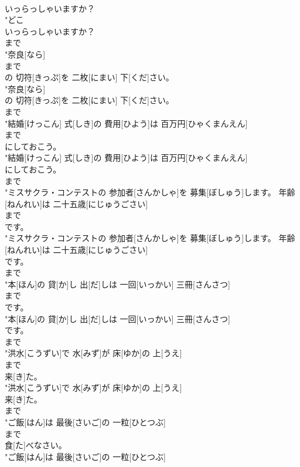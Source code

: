 \documentclass[8pt]{extreport}
\begin{document}
\begin{CJK}{UTF8}{min}
\\	いっらっしゃいますか？
\\	"どこ
\\	いっらっしゃいますか？
\\	まで
\\	"奈良[なら]
\\	まで
\\	の 切符[きっぷ]を 二枚[にまい] 下[くだ]さい。
\\	"奈良[なら]
\\	の 切符[きっぷ]を 二枚[にまい] 下[くだ]さい。
\\	まで
\\	"結婚[けっこん] 式[しき]の 費用[ひよう]は 百万円[ひゃくまんえん]
\\	まで
\\	にしておこう。
\\	"結婚[けっこん] 式[しき]の 費用[ひよう]は 百万円[ひゃくまんえん]
\\	にしておこう。
\\	まで
\\	"ミスサクラ・コンテストの 参加者[さんかしゃ]を 募集[ぼしゅう]します。 年齢[ねんれい]は 二十五歳[にじゅうごさい]
\\	まで
\\	です。
\\	"ミスサクラ・コンテストの 参加者[さんかしゃ]を 募集[ぼしゅう]します。 年齢[ねんれい]は 二十五歳[にじゅうごさい]
\\	です。
\\	まで
\\	"本[ほん]の 貸[か]し 出[だ]しは 一回[いっかい] 三冊[さんさつ]
\\	まで
\\	です。
\\	"本[ほん]の 貸[か]し 出[だ]しは 一回[いっかい] 三冊[さんさつ]
\\	です。
\\	まで
\\	"洪水[こうずい]で 水[みず]が 床[ゆか]の 上[うえ]
\\	まで
\\	来[き]た。
\\	"洪水[こうずい]で 水[みず]が 床[ゆか]の 上[うえ]
\\	来[き]た。
\\	まで
\\	"ご飯[はん]は 最後[さいご]の 一粒[ひとつぶ]
\\	まで
\\	食[た]べなさい。
\\	"ご飯[はん]は 最後[さいご]の 一粒[ひとつぶ]

\end{CJK}
\end{document}
